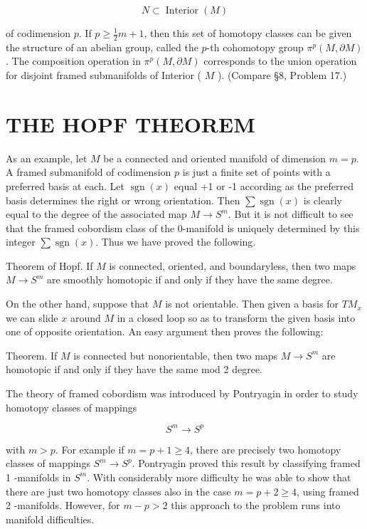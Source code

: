 \documentclass[10pt, letterpaper]{article}
\begin{document}
$$
N \subset \operatorname{Interior}(M)
$$

of codimension $p$. If $p \geq \frac{1}{2} m+1$, then this set of homotopy classes can be given the structure of an abelian group, called the $p$-th cohomotopy group $\pi^{p}(M, \partial M)$. The composition operation in $\pi^{p}(M, \partial M)$ corresponds to the union operation for disjoint framed submanifolds of Interior ( $M$ ). (Compare §8, Problem 17.)

\section*{THE HOPF THEOREM}
As an example, let $M$ be a connected and oriented manifold of dimension $m=p$. A framed submanifold of codimension $p$ is just a finite set of points with a preferred basis at each. Let $\operatorname{sgn}(x)$ equal +1 or -1 according as the preferred basis determines the right or wrong orientation. Then $\sum \operatorname{sgn}(x)$ is clearly equal to the degree of the associated map $M \rightarrow S^{m}$. But it is not difficult to see that the framed cobordism class of the 0-manifold is uniquely determined by this integer $\sum \operatorname{sgn}(x)$. Thus we have proved the following.

Theorem of Hopf. If $M$ is connected, oriented, and boundaryless, then two maps $M \rightarrow S^{m}$ are smoothly homotopic if and only if they have the same degree.

On the other hand, suppose that $M$ is not orientable. Then given a basis for $T M_{x}$ we can slide $x$ around $M$ in a closed loop so as to transform the given basis into one of opposite orientation. An easy argument then proves the following:

Theorem. If $M$ is connected but nonorientable, then two maps $M \rightarrow S^{m}$ are homotopic if and only if they have the same mod 2 degree.

The theory of framed cobordism was introduced by Pontryagin in order to study homotopy classes of mappings

$$
S^{m} \rightarrow S^{p}
$$

with $m>p$. For example if $m=p+1 \geq 4$, there are precisely two homotopy classes of mappings $S^{m} \rightarrow S^{p}$. Pontryagin proved this result by classifying framed 1 -manifolds in $S^{m}$. With considerably more difficulty he was able to show that there are just two homotopy classes also in the case $m=p+2 \geq 4$, using framed 2 -manifolds. However, for $m-p>2$ this approach to the problem runs into manifold difficulties.
\end{document}
